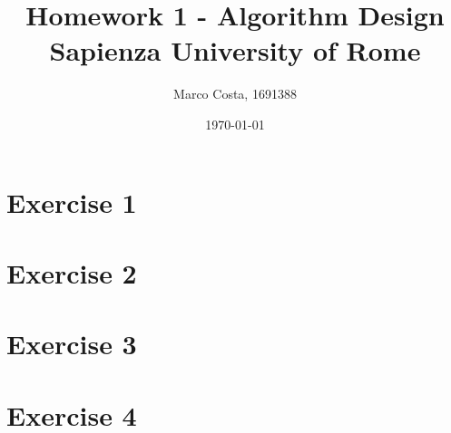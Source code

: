 \documentclass[11pt]{report}
\title{Homework 1 - Algorithm Design \\ \bigskip \large Sapienza University of Rome}
\date{\today}
\author{Marco Costa, 1691388}
\begin{document}
\maketitle
\newpage

\section*{Exercise 1}

\newpage

\section*{Exercise 2}

\newpage

\section*{Exercise 3}

\newpage

\section*{Exercise 4}
\end{document}
